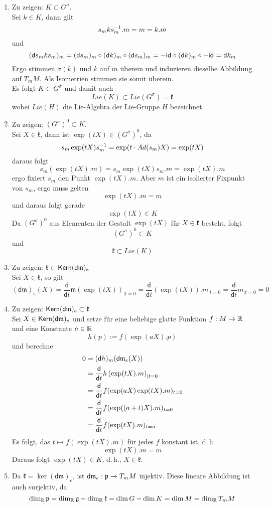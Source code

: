 \documentclass{book}
\renewcommand{\d}{\textsf{d}}
\newcommand{\g}{\mathfrak{g}}
\newcommand{\kf}{\mathfrak{k}}
\newcommand{\p}{\mathfrak{p}}
\newcommand{\m}{\mathfrak{m}}
\begin{document}
\begin{Beweis}{}
\begin{enumerate}[1.)]
\item Zu zeigen: $K \subset G^\sigma$.\\
Sei $k \in K$, dann gilt
\[ s_mks_m^{-1}.m = m = k.m \]
und
\[ (\d s_mks_m)_m = (\d s_m)_m \circ (\d k)_m \circ (\d s_m)_m = -\id{} \circ (\d k)_m \circ -\id{} = \d k_m \]
Ergo stimmen $\sigma(k)$ und $k$ auf $m$ überein und induzieren dieselbe Abbildung auf $T_mM$. Als Isometrien stimmen sie somit überein.\\
Es folgt $K \subset G^\sigma$ und damit auch
\[ Lie(K) \subset Lie(G^\sigma) = \kf \]
wobei $Lie(H)$ die Lie-Algebra der Lie-Gruppe $H$ bezeichnet.
\item Zu zeigen: $(G^\sigma)^0 \subset K$.\\
Sei $X \in \kf$, dann ist $\exp(tX) \in (G^\sigma)^0$, da
\[ s_m \exp(tX) s_m^{-1} = \exp (t\cdot Ad(s_m)X) = \exp(tX) \]
daraus folgt
\[ s_m(\exp(tX).m) = s_m \exp(tX)s_m.m = \exp(tX).m \]
ergo fixiert $s_m$ den Punkt $\exp(tX).m$. Aber $m$ ist ein isolierter Fixpunkt von $s_m$, ergo muss gelten
\[ \exp(tX).m = m \]
und daraus folgt gerade
\[ \exp(tX) \in K \]
Da $(G^\sigma)^0$ aus Elementen der Gestalt $\exp(tX)$ für $X \in \kf$ besteht, folgt
\[ (G^\sigma)^0 \subset K \]
und
\[ \kf \subset Lie(K) \]
\item Zu zeigen: $\kf \subset \Ker (\d \m)_e$\\
Sei $X \in \kf$, so gilt
\[ (\d \m)_e(X) = \frac{\d}{\d t} \m(\exp(tX))_{|t = 0} = \frac{\d}{\d t}(\exp(tX)).m_{|t = 0} = \frac{\d}{\d t}m_{|t = 0} = 0 \]
\item Zu zeigen: $\Ker (\d \m)_e\subset \kf $\\
Sei $X \in \Ker (\d \m)_e$ und setze für eine beliebige glatte Funktion $f : M \overset{}{\rightarrow} \mathbb{R}$ und eine Konstante $a \in \mathbb{R}$
\[ h(p) := f(\exp(aX).p) \]
und berechne
\begin{align*}
0 &= (\d h)_m (\d \m_e(X))\\
 &= \frac{\d}{\d t} h\klam{ \exp (tX).m }_{|t = 0}\\
 &= \frac{\d}{\d t} f(\exp(aX)\exp(tX).m)_{t = 0}\\
 &= \frac{\d}{\d t} f(\exp((a+t)X).m)_{t = 0}\\
 &= \frac{\d}{\d t} f(\exp(tX).m)_{t = a}
\end{align*}
Es folgt, das $t \mapsto f(\exp(tX).m)$ für jedes $f$ konstant ist, d.\,h.
\[ \exp(tX).m = m \]
Daraus folgt $\exp(tX) \in K$, d.\,h., $X \in \kf$.
\item Da $\kf = \ker (\d \m)_e$, ist $\d \m_e : \p \pfeil{} T_mM$ injektiv. Diese lineare Abbildung ist auch surjektiv, da
\[ \dim_\R \p = \dim_\R \g - \dim_\R \kf = \dim G - \dim K = \dim M = \dim_\R T_mM \]
\end{enumerate}
\end{Beweis}
\end{document}
